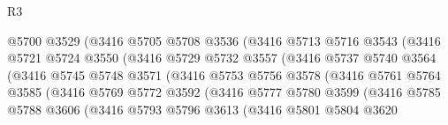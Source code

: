 \begin{lexlean}{R3}
\begin{coremodule}
                              @5700
                              @3529
                              (@3416
                                @5705
                                @5708
                                @3536
                                (@3416
                                  @5713
                                  @5716
                                  @3543
                                  (@3416
                                    @5721
                                    @5724
                                    @3550
                                    (@3416
                                      @5729
                                      @5732
                                      @3557
                                      (@3416
                                        @5737
                                        @5740
                                        @3564
                                        (@3416
                                          @5745
                                          @5748
                                          @3571
                                          (@3416
                                            @5753
                                            @5756
                                            @3578
                                            (@3416
                                              @5761
                                              @5764
                                              @3585
                                              (@3416
                                                @5769
                                                @5772
                                                @3592
                                                (@3416
                                                  @5777
                                                  @5780
                                                  @3599
                                                  (@3416
                                                    @5785
                                                    @5788
                                                    @3606
                                                    (@3416
                                                      @5793
                                                      @5796
                                                      @3613
                                                      (@3416
                                                        @5801
                                                        @5804
                                                        @3620

\end{coremodule}
\end{lexlean}
